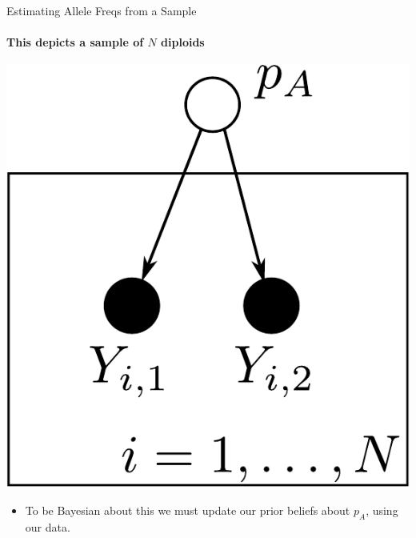 \documentclass[letter,graphicx]{beamer}
\begin{document}
\begin{frame}{Estimating Allele Freqs from a Sample}
\framesubtitle{This depicts a sample of $N$ diploids}
\begin{center}
\includegraphics[height=.65\textheight]{../diagrams/slide_infer1-crop.pdf}
\end{center}
\begin{itemize}
\item To be Bayesian about this we must update our prior beliefs about $p_A$, using our data.
\end{itemize}
\end{frame}
\end{document}
